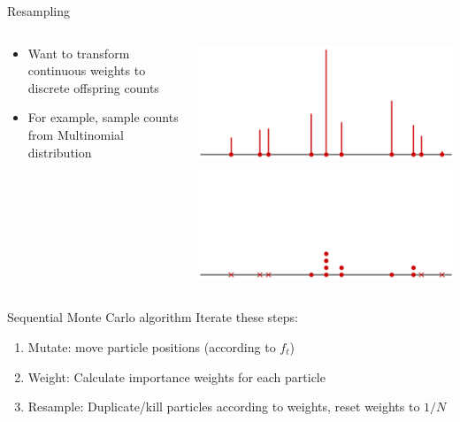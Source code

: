 \documentclass[aspectratio=169]{beamer}
\theoremstyle{definition}
\begin{document}
\begin{frame}{Resampling}
\begin{columns}
\begin{column}{0.45\textwidth}
\begin{itemize}
\item Want to transform continuous weights to discrete offspring counts
\item For example, sample counts from Multinomial distribution 
\end{itemize}
\end{column}
\begin{column}{0.45\textwidth}
\centering
\includegraphics[width=\textwidth]{resample1.pdf} \\
\includegraphics[width=\textwidth]{resample2.pdf}
\end{column}
\end{columns}

\end{frame}


\begin{frame}{Sequential Monte Carlo algorithm}
Iterate these steps:
\begin{enumerate}
\item Mutate: move particle positions (according to $f_t$)
\item Weight: Calculate importance weights for each particle
\item Resample: Duplicate/kill particles according to weights, reset weights to $1/N$
\end{enumerate}
\end{frame}
\end{document}
